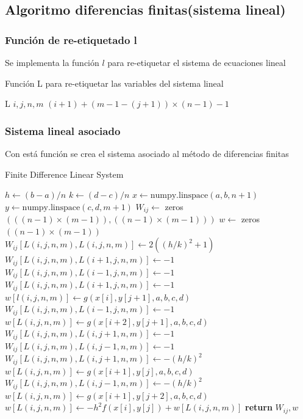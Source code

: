 \documentclass[a4paper]{article}
\begin{document}
\subsection{Algoritmo diferencias finitas(sistema lineal)}
\subsubsection{Función de re-etiquetado l}
Se implementa la función $l$ para re-etiquetar el sistema de ecuaciones lineal
\begin{algorithm}[H]
\caption{Función L para re-etiquetar las variables del sistema lineal}\label{alg::funcL}
\begin{algorithmic}[H]
\Function L {$i, j, n, m$}
\State \Return $(i+1) + (m-1-(j+1)) \times (n-1) - 1$
\EndFunction
\end{algorithmic}
\end{algorithm}
\subsubsection{Sistema lineal asociado}
Con está función se crea el sistema asociado al método de diferencias finitas
\begin{algorithm}[H]
\caption{Finite Difference Linear System}\label{alg::finite_difference}
\begin{algorithmic}[H]
\State $h \gets (b-a)/n$
\State $k \gets (d-c)/n$
\State $x \gets \text{numpy.linspace}(a, b, n+1)$
\State $y \gets \text{numpy.linspace}(c, d, m+1)$
\State $W_{ij} \gets$ zeros $(((n-1)\times(m-1)),((n-1)\times(m-1)))$
\State $w \gets$ zeros $((n-1)\times(m-1))$
\State $W_{ij}[L(i,j,n,m), L(i,j,n,m)] \gets 2((h/k)^2 + 1)$
\State $W_{ij}[L(i,j,n,m), L(i+1,j,n,m)] \gets -1$
\State $W_{ij}[L(i,j,n,m), L(i-1,j,n,m)] \gets -1$
\Else
{}
\State $W_{ij}[L(i,j,n,m), L(i+1,j,n,m)] \gets -1$
\State $w[l(i,j,n,m)] \gets g(x[i], y[j+1], a, b, c, d)$
\EndIf
{}
\State $W_{ij}[L(i,j,n,m), L(i-1,j,n,m)] \gets -1$
\State $w[L(i,j,n,m)] \gets g(x[i+2], y[j+1], a, b, c, d)$
\EndIf
\EndIf
{}
\State $W_{ij}[L(i,j,n,m), L(i,j+1,n,m)] \gets -1$
\State $W_{ij}[L(i,j,n,m), L(i,j-1,n,m)] \gets -1$
\Else
{}
\State $W_{ij}[L(i,j,n,m), L(i,j+1,n,m)] \gets -(h/k)^2$
\State $w[L(i,j,n,m)] \gets g(x[i+1], y[j], a, b, c, d)$
\EndIf
{}
\State $W_{ij}[L(i,j,n,m), L(i,j-1,n,m)] \gets -(h/k)^2$
\State $w[L(i,j,n,m)] \gets g(x[i+1], y[j+2], a, b, c, d)$
\EndIf
\EndIf
\State $w[L(i,j,n,m)] \gets -h^2f(x[i], y[j])+w[L(i,j,n,m)]$
\EndFor
\EndFor
\State \textbf{return} $W_{ij}, w$
\EndFunction
\end{algorithmic}
\end{algorithm}
\end{document}
